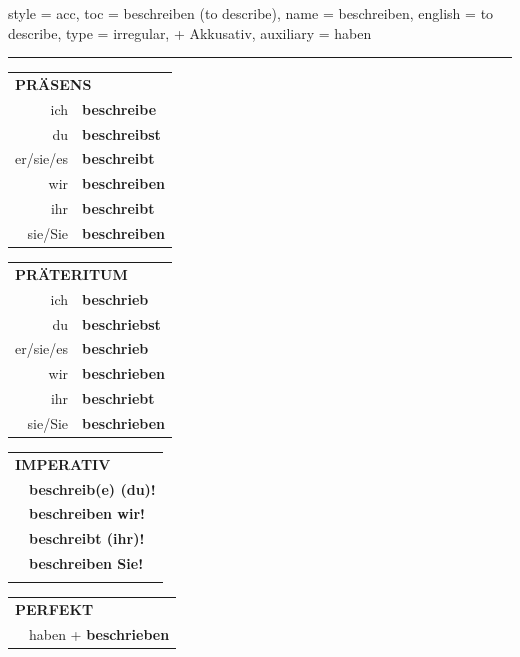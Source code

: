 \begin{verbentry}{
  style = {acc},
  toc = {beschreiben (to describe)},
  name = {beschreiben},
  english = {to describe},
  type = {irregular, + Akkusativ},
  auxiliary = {haben}
}
 
    
     \vspace{5pt}

    \hrule
    
    \vspace{5pt}

  \begin{tabular}{rl}
     \multicolumn{2}{l}{\textbf{PRÄSENS} }\\
    ich & \textbf{beschreibe}\\
    du & \textbf{beschreibst}\\
    er/sie/es & \textbf{beschreibt}\\
    wir & \textbf{beschreiben}\\
    ihr & \textbf{beschreibt}\\
    sie/Sie & \textbf{beschreiben}\\
  \end{tabular}
  \hfill
     \begin{tabular}{rl}
    \multicolumn{2}{l}{\textbf{PRÄTERITUM} }\\
    ich & \textbf{beschrieb}\\
    du & \textbf{beschriebst}\\
    er/sie/es & \textbf{beschrieb}\\
    wir & \textbf{beschrieben}\\
    ihr & \textbf{beschriebt}\\
    sie/Sie & \textbf{beschrieben}\\
  \end{tabular}
  \hfill
  \begin{tabular}{rl}
     \multicolumn{2}{l}{\textbf{IMPERATIV} }\\
   & \textbf{beschreib(e) (du)!}\\
   & \textbf{beschreiben wir!}\\
   & \textbf{beschreibt (ihr)!}\\
   & \textbf{beschreiben Sie!}\\
   & \vspace{10pt}
  \end{tabular}

    \vspace{10pt}

 \begin{tabular}{rl}
     \multicolumn{2}{l}{\textbf{PERFEKT}}\\
   & haben + \textbf{beschrieben}\\
  \end{tabular}
\hfill
   \begin{tabular}{rl}
   

\end{tabular}
\end{verbentry}
